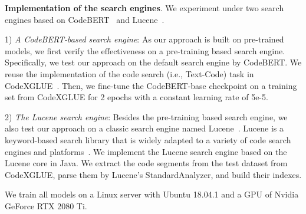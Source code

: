 \documentclass[sigconf,screen]{acmart}
\newcommand{\ie}{\hbox{i.e.}\xspace}
\begin{document}
\smallskip\textbf{Implementation of the search engines}. We experiment under two search engines based on CodeBERT~\cite{feng2020codebert} and Lucene~\cite{Lucene}. 

1) \textit{A CodeBERT-based search engine}: As our approach is built on pre-trained models, we first verify the effectiveness on a pre-training based search engine. Specifically, we test our approach on the default search engine by CodeBERT. We reuse the implementation of the code search (\ie, Text-Code) task in CodeXGLUE~\cite{CodeXGlue}. Then, we fine-tune the CodeBERT-base checkpoint on a training set from CodeXGLUE for 2 epochs with a constant learning rate of 5e-5. 

2) \textit{The Lucene search engine}: Besides the pre-training based search engine, we also test our approach on a classic search engine named Lucene~\cite{Lucene}. Lucene is a keyword-based search library that is widely adapted to a variety of code search engines and platforms~\cite{solr, indextank, gormley2015elasticsearch}. We implement the Lucene search engine based on the Lucene core in Java. We extract the code segments from the test dataset from CodeXGLUE, parse them by Lucene's StandardAnalyzer, and build their indexes. 

We train all models on a Linux server with Ubuntu 18.04.1 and a GPU of Nvidia GeForce RTX 2080 Ti.
\end{document}
